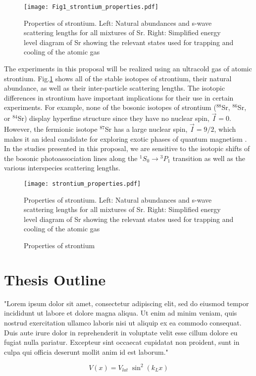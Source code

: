 	\begin{figure}
		\centerline{
		\texttt{[image: Fig1\_strontium\_properties.pdf]}}
		\caption{Properties of strontium. Left: Natural abundances and s-wave scattering lengths for all mixtures of Sr. Right: Simplified energy level diagram of Sr showing the relevant states used for trapping and cooling of the atomic gas}
	\end{figure} 
The experiments in this proposal will be realized using an ultracold gas of atomic strontium. Fig.\;\ref{fig:energy_level_diagram} shows all of the stable isotopes of strontium, their natural abundance, as well as their inter-particle scattering lengths. The isotopic differences in strontium have important implications for their use in certain experiments. For example, none of the bosonic isotopes of strontium ($^{88}$Sr, $^{86}$Sr, or $^{84}$Sr) display hyperfine structure since they have no nuclear spin, $\vec{I}=0$. However, the fermionic isotope $^{87}$Sr has a large nuclear spin, $\vec{I}=9/2$, which makes it an ideal candidate for exploring exotic phases of quantum magnetism \cite{Beverland2016,Cazalilla2014,Chen2015}. In the studies presented in this proposal, we are sensitive to the isotopic shifts of the bosonic photoassociation lines along the $^1S_0\!\rightarrow\!^3P_1$ transition as well as the various interspecies scattering lengths.

\begin{figure}
\label{fig:energy_level_diagram}
	\centerline{
	\texttt{[image: strontium\_properties.pdf]}}
	\caption{Properties of strontium}{Properties of strontium. Left: Natural abundances and s-wave scattering lengths for all mixtures of Sr. Right: Simplified energy level diagram of Sr showing the relevant states used for trapping and cooling of the atomic gas}
\end{figure} 

\section{Thesis Outline}
\label{sec:outline}

"Lorem ipsum dolor sit amet, consectetur adipiscing elit, sed do eiusmod tempor incididunt ut labore et dolore magna aliqua. Ut enim ad minim veniam, quis nostrud exercitation ullamco laboris nisi ut aliquip ex ea commodo consequat. Duis aute irure dolor in reprehenderit in voluptate velit esse cillum dolore eu fugiat nulla pariatur. Excepteur sint occaecat cupidatat non proident, sunt in culpa qui officia deserunt mollit anim id est laborum."


\begin{equation} 
\label{eq:1dlattice}
		 V(x) = V_{lat} \; \sin^2(k_L x)
\end{equation}



